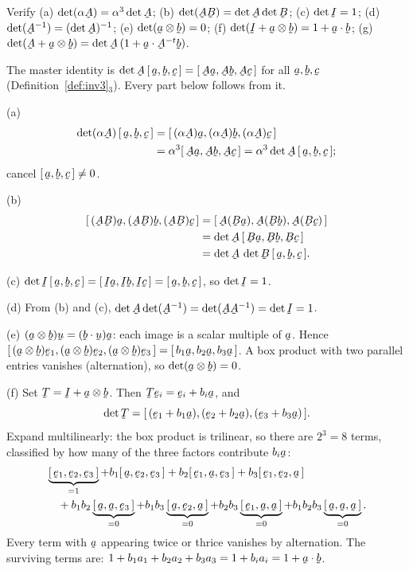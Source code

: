 \begin{problem}
Verify (a) $\det(\alpha\bA)=\alpha^3\det\bA$; (b)
$\det(\bA\bB)=\det\bA\det\bB$; (c) $\det\I=1$; (d)
$\det(\bA^{-1})=(\det\bA)^{-1}$; (e) $\det(\ba\otimes\bb)=0$; (f)
$\det(\I+\ba\otimes\bb)=1+\ip\ba\bb$; (g)
$\det(\bA+\ba\otimes\bb)=\det\bA\,(1+\ip\ba{\bA^{-t}\bb})$.
\end{problem}
\begin{solution}
The master identity is $\det\bA\,\tbox\ba\bb\bc=\tbox{\bA\ba}{\bA\bb}{\bA\bc}$
for all $\ba,\bb,\bc$ (Definition~\ref{def:inv3}$_3$). Every part below
follows from it.

(a)
\[
\begin{aligned}
\det(\alpha\bA)\,\tbox\ba\bb\bc
&=\tbox{(\alpha\bA)\ba}{(\alpha\bA)\bb}{(\alpha\bA)\bc}\\
&=\alpha^3\tbox{\bA\ba}{\bA\bb}{\bA\bc}
=\alpha^3\det\bA\,\tbox\ba\bb\bc;
\end{aligned}
\]
cancel $\tbox\ba\bb\bc\neq0$.

(b)
\[
\begin{aligned}
\tbox{(\bA\bB)\ba}{(\bA\bB)\bb}{(\bA\bB)\bc}
&=\tbox{\bA(\bB\ba)}{\bA(\bB\bb)}{\bA(\bB\bc)}\\
&=\det\bA\,\tbox{\bB\ba}{\bB\bb}{\bB\bc}\\
&=\det\bA\,\det\bB\,\tbox\ba\bb\bc.
\end{aligned}
\]

(c) $\det\I\,\tbox\ba\bb\bc=\tbox{\I\ba}{\I\bb}{\I\bc}
=\tbox\ba\bb\bc$, so $\det\I=1$.

(d) From (b) and (c), $\det\bA\det(\bA^{-1})=\det(\bA\bA^{-1})=\det\I=1$.

(e) $(\ba\otimes\bb)\bu=(\ip\bb\bu)\ba$: each image is a scalar multiple
of $\ba$. Hence $\tbox{(\ba\otimes\bb)\be_1}{(\ba\otimes\bb)\be_2}
{(\ba\otimes\bb)\be_3}=\tbox{b_1\ba}{b_2\ba}{b_3\ba}$. A box product
with two parallel entries vanishes (alternation), so $\det(\ba\otimes\bb)=0$.

(f) Set $\bT=\I+\ba\otimes\bb$. Then $\bT\be_i=\be_i+b_i\ba$, and
\[
\det\bT=\tbox{(\be_1+b_1\ba)}{(\be_2+b_2\ba)}{(\be_3+b_3\ba)}.
\]
Expand multilinearly: the box product is trilinear, so there are $2^3=8$
terms, classified by how many of the three factors contribute $b_i\ba$:
\[
\begin{aligned}
&\underbrace{\tbox{\be_1}{\be_2}{\be_3}}_{=1}
+b_1\tbox\ba{\be_2}{\be_3}
+b_2\tbox{\be_1}\ba{\be_3}
+b_3\tbox{\be_1}{\be_2}\ba\\
&\quad+b_1b_2\underbrace{\tbox\ba\ba{\be_3}}_{=0}
+b_1b_3\underbrace{\tbox\ba{\be_2}\ba}_{=0}
+b_2b_3\underbrace{\tbox{\be_1}\ba\ba}_{=0}
+b_1b_2b_3\underbrace{\tbox\ba\ba\ba}_{=0}.
\end{aligned}
\]
Every term with $\ba$ appearing twice or thrice vanishes by alternation.
The surviving terms are: $1+b_1a_1+b_2a_2+b_3a_3=1+b_ia_i=1+\ip\ba\bb$.


\end{solution}

